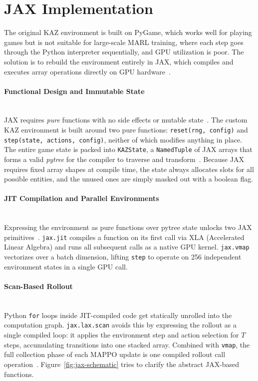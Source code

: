 \section{JAX Implementation}
The original KAZ environment is built on PyGame, which works well for playing games but is not suitable for large-scale MARL training, where each step goes through the Python interpreter sequentially, and GPU utilization is poor. The solution is to rebuild the environment entirely in JAX, which compiles and executes array operations directly on GPU hardware~\cite{jax2018}.

\paragraph{Functional Design and Immutable State}\mbox{}\\
JAX requires \emph{pure} functions with no side effects or mutable state~\cite{jax2018}. The custom KAZ environment is built around two pure functions: \texttt{reset(rng, config)} and \texttt{step(state, actions, config)}, neither of which modifies anything in place. The entire game state is packed into \texttt{KAZState}, a \texttt{NamedTuple} of JAX arrays that forms a valid \emph{pytree} for the compiler to traverse and transform~\cite{jax2018}. Because JAX requires fixed array shapes at compile time, the state always allocates slots for all possible entities, and the unused ones are simply masked out with a boolean flag.

\paragraph{JIT Compilation and Parallel Environments}\mbox{}\\
Expressing the environment as pure functions over pytree state unlocks two JAX primitives~\cite{jax2018}. \texttt{jax.jit} compiles a function on its first call via XLA (Accelerated Linear Algebra) and runs all subsequent calls as a native GPU kernel. \texttt{jax.vmap} vectorizes over a batch dimension, lifting \texttt{step} to operate on 256 independent environment states in a single GPU call.

\paragraph{Scan-Based Rollout}\mbox{}\\
Python \texttt{for} loops inside JIT-compiled code get statically unrolled into the computation graph. \texttt{jax.lax.scan} avoids this by expressing the rollout as a single compiled loop: it applies the environment step and action selection for $T$ steps, accumulating transitions into one stacked array. Combined with \texttt{vmap}, the full collection phase of each MAPPO update is one compiled rollout call operation~\cite{jax2018}. Figure~\ref{fig:jax-schematic} tries to clarify the abstract JAX-based functions.


